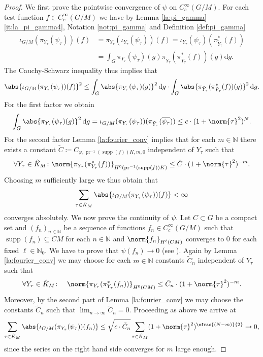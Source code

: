 \documentclass[JEP,XML,SOM,NoFloatCountersInSection,Unicode,published]{cedram}
\newcommand{\psfrac}[2]{\sfrac{(#1)}{#2}}
\theoremstyle{definition}
\DeclarePairedDelimiter{\abs}\lvert\rvert
\DeclarePairedDelimiter{\norm}\lVert\rVert
\newcommand{\sn}[3]{\ensuremath{\norm{#3}_{H^{#1}(#2)}}}
\newcommand{\on}[1]{\ensuremath{\operatorname{#1}}}
\newcommand{\N}{\ensuremath{\mathbb{N}}}
\newcommand{\intd}{\ensuremath{\,\mathrm{d}}}
\begin{document}
\begin{proof}
We first prove the pointwise convergence of $\psi$ on $C_c^\infty(G/M)$. For each test function $f\in C_c^\infty(G/M)$ we have by Lemma \ref{la:pi_gamma}\,\eqref{it:la_pi_gamma4}, Notation \ref{not:pi_gamma} and Definition \ref{def:pi_gamma}
\begin{align*}
\iota_{G/M}(\pi_{Y_\tau}(\psi_{\tau}))(f)&=\pi_{Y_\tau}(\iota_{Y_\tau}(\psi_{\tau}))(f)=\iota_{Y_\tau}(\psi_\tau)(\pi_{\tilde Y_\tau}^*(f))\\
&=\int_G\pi_{Y_\tau}(\psi_\tau)(g)\pi_{\tilde Y_\tau}(\pi_{\tilde Y_\tau}^*(f))(g)\mathrm{d}g.
\end{align*}
The Cauchy-Schwarz inequality thus implies that
\[
\abs{\iota_{G/M}(\pi_{Y_\tau}(\psi_{\tau}))(f)}^2\leq\int_G\abs{\pi_{Y_\tau}(\psi_\tau)(g)}^2\intd g\cdot\int_G\abs{\pi_{\tilde Y_\tau}(\pi_{\tilde Y_\tau}^*(f))(g)}^2\intd g.
\]
For the first factor we obtain
\[
\int_G\abs{\pi_{Y_\tau}(\psi_\tau)(g)}^2\intd g=\iota_{G/M}(\pi_{Y_\tau}(\psi_{\tau}))(\pi_{\tilde Y_\tau}(\overline{\psi_{\tau}}) )\leq c\cdot(1+\norm{\tau}^2)^N.
\]
For the second factor Lemma \ref{la:fourier_conv} implies that for each $m\in\N$ there exists a constant $\tilde C\coloneqq C_{\varphi,\on{pr}^{-1}(\on{supp}(f))K,m,0}$ independent of $Y_\tau$ such that
\[
\forall Y_\tau\in\hat K_M\colon\sn{0}{\on{pr}^{-1}(\on{supp}(f))K}{\pi_{Y_\tau}(\pi_{Y_\tau}^*(f))}\leq \tilde C\cdot (1+\norm{\tau}^2)^{-m}.
\]
Choosing $m$ sufficiently large we thus obtain that
\[
\sum_{\tau\in\hat K_M}\abs{\iota_{G/M}(\pi_{Y_\tau}(\psi_{\tau}))(f)}<\infty
\]
converges absolutely. We now prove the continuity of $\psi$. Let $C\subset G$ be a compact set and $(f_n)_{n\in\N}$ be a sequence of functions $f_n\in C_c^\infty(G/M)$ such that $\on{supp}(f_n)\subseteq CM$ for each $n\in\N$ and $\sn{\ell}{CM}{f_n}$ converges to $0$ for each fixed $\ell\in\N_0$. We have to prove that $\psi(f_n)\to0$ (see \cite[Th.\,2.1.4]{H90}). Again by Lemma \ref{la:fourier_conv} we may choose for each $m\in\N$ constants $\tilde C_n$ independent of $Y_\tau$ such that
\[
\forall Y_\tau\in\hat K_M\colon\quad\sn{0}{CM}{\pi_{Y_\tau}(\pi_{Y_\tau}^*(f_n))}\leq \tilde C_n\cdot (1+\norm{\tau}^2)^{-m}.
\]
Moreover, by the second part of Lemma \ref{la:fourier_conv} we may choose the constants $\tilde C_n$ such that $\lim_{n\to\infty}\tilde C_n=0$. Proceeding as above we arrive at
\[
\sum_{\tau\in\hat K_M}\abs{\iota_{G/M}(\pi_{Y_\tau}(\psi_{\tau}))(f_n)}\leq\sqrt{c\cdot\tilde C_n}\sum_{\tau\in\hat K_M}(1+\norm{\tau}^2)^{\psfrac{N-m}{2}}\to 0,
\]
since the series on the right hand side converges for $m$ large enough.
\end{proof}
\end{document}
